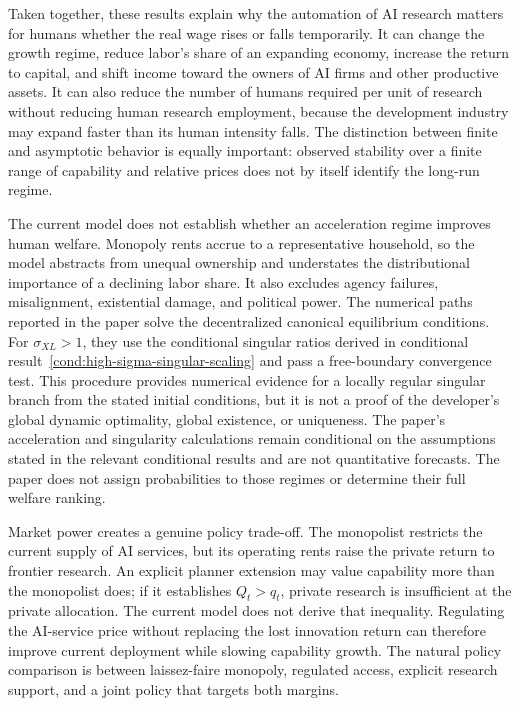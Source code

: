 Taken together, these results explain why the automation of AI research matters for
humans whether the real wage rises or falls temporarily. It can change the growth regime, reduce
labor's share of an expanding economy, increase the return to capital, and shift
income toward the owners of AI firms and other productive assets. It can also reduce
the number of humans required per unit of research without reducing human research
employment, because the development industry may expand faster than its human
intensity falls. The distinction between finite and asymptotic behavior is equally
important: observed stability over a finite range of capability and relative prices
does not by itself identify the long-run regime.

The current model does not establish whether an acceleration regime improves human
welfare. Monopoly rents accrue to a representative household, so the model abstracts
from unequal ownership and understates the distributional importance of a declining
labor share. It also excludes agency failures, misalignment, existential damage, and
political power. The numerical paths reported in the paper solve the decentralized
canonical equilibrium conditions. For $\sigma_{XL}>1$, they use the conditional singular
ratios derived in conditional result~\ref{cond:high-sigma-singular-scaling} and pass a
free-boundary convergence test. This procedure provides numerical evidence for a
locally regular singular branch from the stated initial conditions, but it is not a
proof of the developer's global dynamic optimality, global existence, or uniqueness.
The paper's acceleration and singularity calculations
remain conditional on the assumptions stated in the relevant conditional results and are
not quantitative forecasts. The paper does not assign probabilities to those
regimes or determine their full welfare ranking.

Market power creates a genuine policy trade-off. The monopolist restricts the current
supply of AI services, but its operating rents raise the private return to frontier
research. An explicit planner extension may value capability more than the monopolist
does; if it establishes $Q_t>q_t$, private research is insufficient at the private
allocation. The current model does not derive that inequality. Regulating the
AI-service price without replacing the lost innovation return can therefore improve
current deployment while slowing capability growth. The natural policy comparison is
between laissez-faire monopoly, regulated access, explicit research support, and a
joint policy that targets both margins.

